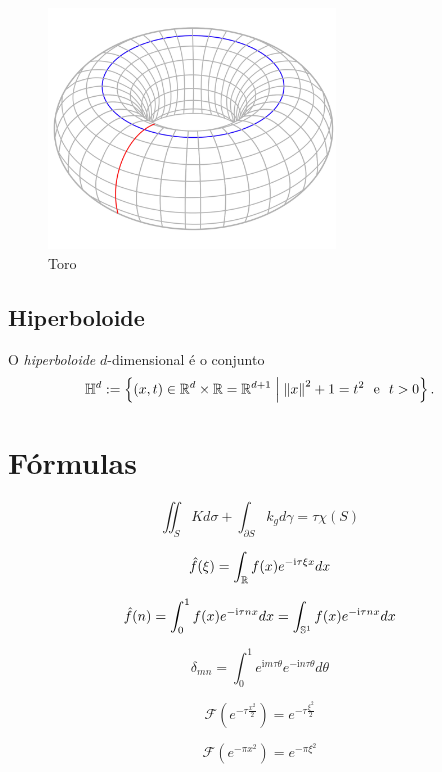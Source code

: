 \begin{figure}[!h]
\centering
\includegraphics[width=3in]{./imagens/toro}
\caption{Toro}
\end{figure}

\subsection{Hiperboloide}

\begin{defi}
O \emph{hiperboloide} $d$-dimensional é o conjunto
	\begin{equation*}
	\mathbb{H}^d := \left\{(x,t) \in \mathbb{R}^d \times \mathbb{R} = \mathbb{R}^{d+1} \;\middle\vert\; \left\Vert{x}\right\Vert^2+1=t^2 \text{\ \ e\ \ } t>0 \right\}.
	\end{equation*}
\end{defi}



















\cleardoublepage


\section*{Fórmulas}
\newcommand{\ii}{\mathrm{i}}

\begin{equation*}
\iint_S K d\sigma + \int_{\partial S} k_g d\gamma = \tau\chi(S)
\end{equation*}

\begin{equation*}
\hat f(\xi) = \int_{\R} f(x)e^{- \ii \tau \xi x} dx
\end{equation*}

\begin{equation*}
\hat f(n) = \int_0^1 f(x) e^{- \ii \tau n x} dx = \int_{\S^1} f(x) e^{- \ii \tau n x} dx
\end{equation*}


\begin{equation*}
\delta_{mn} = \int_0^1 e^{\ii m\tau \theta}e^{-\ii n \tau \theta}d\theta
\end{equation*}

\begin{equation*}
\mathcal{F}(e^{-\tau \frac{x^2}{2}}) = e^{-\tau \frac{\xi^2}{2}}
\end{equation*}

\begin{equation*}
\mathcal{F}(e^{-\pi x^2}) = e^{-\pi \xi^2}
\end{equation*}









